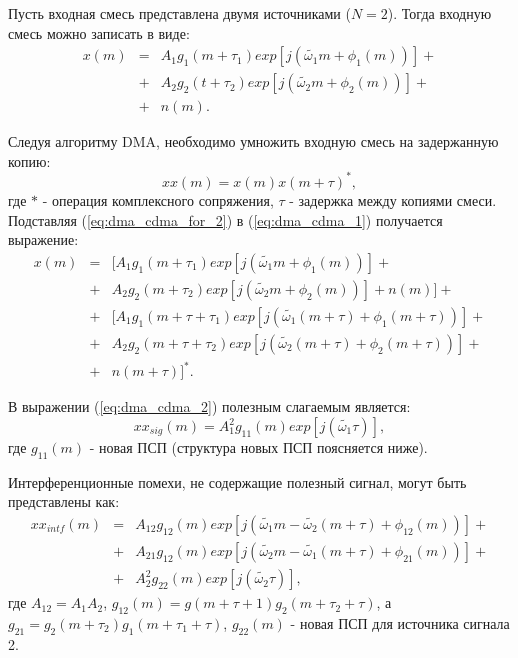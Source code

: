 Пусть входная смесь представлена двумя источниками (${N=2}$). Тогда входную смесь можно записать в виде:
\begin{eqnarray}
	\label{eq:dma_cdma_for_2}
	x(m) & = &	A_1 g_1(m + \tau_1) exp \left[ j \left( \tilde{\omega_1} m + \phi_1 (m) \right) \right] + \nonumber \\
	     & + & A_2 g_2(t + \tau_2) exp \left[ j \left(  \tilde{\omega_2} m + \phi_2 (m) \right) \right] + \\
	     & + & n(m). \nonumber
\end{eqnarray}

Следуя алгоритму DMA, необходимо умножить входную смесь на задержанную копию:
\begin{equation}
	\label{eq:dma_cdma_1}
	xx(m) = x(m)x(m+\tau)^*,
\end{equation}
где ${*}$ - операция комплексного сопряжения, ${\tau}$ - задержка между копиями смеси. Подставляя (\ref{eq:dma_cdma_for_2}) в (\ref{eq:dma_cdma_1}) получается выражение:
\begin{eqnarray}
	\label{eq:dma_cdma_2}
	x(m) & = &[ A_1 g_1(m + \tau_1) exp \left[ j \left( \tilde{\omega_1} m + \phi_1 (m) \right) \right] + \nonumber \\
	     & + & A_2 g_2(m + \tau_2) exp \left[ j \left(  \tilde{\omega_2} m + \phi_2 (m) \right) \right] + n(m) ] + \nonumber \\
	     & + & [A_1 g_1(m + \tau + \tau_1) exp \left[ j \left( \tilde{\omega_1} (m + \tau) + \phi_1 (m + \tau) \right) \right]  + \nonumber \\
	     & + & A_2 g_2(m + \tau + \tau_2) exp \left[ j \left(  \tilde{\omega_2} (m + \tau) + \phi_2 (m + \tau) \right) \right] +  \\
	     & + & n(m + \tau)]^*. \nonumber
\end{eqnarray}

В выражении (\ref{eq:dma_cdma_2}) полезным слагаемым является:
\begin{equation}
	\label{eq:dma_cdma_3}
	xx_{sig}(m) = A^2_1 g_{11}(m) exp[j (\tilde {\omega_1} \tau)],
\end{equation}
где ${g_{11}(m)}$ - новая ПСП (структура новых ПСП поясняется ниже). 

Интерференционные помехи, не содержащие полезный сигнал, могут быть представлены как:
\begin{eqnarray}
	\label{eq:dma_cdma_4}
	xx_{intf}(m) & = & A_{12} g_{12}(m) exp \left[ j \left( \tilde{\omega_1} m - \tilde{\omega_2}(m + \tau) + \phi_{12} (m) \right) \right] + \nonumber \\
		& + & A_{21} g_{12}(m) exp \left[ j \left( \tilde{\omega_2} m - \tilde{\omega_1}(m + \tau) + \phi_{21} (m) \right) \right] + \nonumber \\
		& + & A^2_2 g_{22}(m) exp[j (\tilde {\omega_2} \tau)],
\end{eqnarray}
где ${A_{12}=A_1 A_2}$, ${g_{12}(m)=g(m+\tau+1)g_2(m+\tau_2+\tau)}$, а ${g_{21} = g_2(m+\tau_2)g_1(m+\tau_1+\tau)}$, ${g_{22}(m)}$ - новая ПСП для источника сигнала 2.

